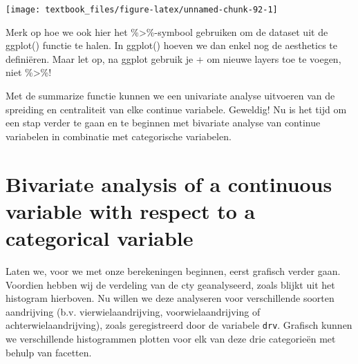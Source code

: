 \documentclass[]{tufte-book}
\newenvironment{Shaded}{}{}
\newcommand{\AttributeTok}[1]{\textcolor[rgb]{0.49,0.56,0.16}{#1}}
\newcommand{\DecValTok}[1]{\textcolor[rgb]{0.25,0.63,0.44}{#1}}
\newcommand{\FloatTok}[1]{\textcolor[rgb]{0.25,0.63,0.44}{#1}}
\newcommand{\FunctionTok}[1]{\textcolor[rgb]{0.02,0.16,0.49}{#1}}
\newcommand{\NormalTok}[1]{#1}
\newcommand{\SpecialCharTok}[1]{\textcolor[rgb]{0.25,0.44,0.63}{#1}}
\newcommand{\StringTok}[1]{\textcolor[rgb]{0.25,0.44,0.63}{#1}}
\begin{document}
\begin{Shaded}
\end{Shaded}

\texttt{[image: textbook\_files/figure-latex/unnamed-chunk-92-1]}

Merk op hoe we ook hier het \%\textgreater\%-symbool gebruiken om de dataset uit de ggplot() functie te halen. In ggplot() hoeven we dan enkel nog de aesthetics te definiëren. Maar let op, na ggplot gebruik je + om nieuwe layers toe te voegen, niet \%\textgreater\%!

Met de summarize functie kunnen we een univariate analyse uitvoeren van de spreiding en centraliteit van elke continue variabele. Geweldig! Nu is het tijd om een stap verder te gaan en te beginnen met bivariate analyse van continue variabelen in combinatie met categorische variabelen.

\hypertarget{bivariate-analysis-of-a-continuous-variable-with-respect-to-a-categorical-variable}{%
\section{Bivariate analysis of a continuous variable with respect to a categorical variable}\label{bivariate-analysis-of-a-continuous-variable-with-respect-to-a-categorical-variable}}

Laten we, voor we met onze berekeningen beginnen, eerst grafisch verder gaan. Voordien hebben wij de verdeling van de cty geanalyseerd, zoals blijkt uit het histogram hierboven. Nu willen we deze analyseren voor verschillende soorten aandrijving (b.v. vierwielaandrijving, voorwielaandrijving of achterwielaandrijving), zoals geregistreerd door de variabele \texttt{drv}. Grafisch kunnen we verschillende histogrammen plotten voor elk van deze drie categorieën met behulp van facetten.
\end{document}
